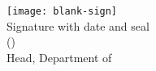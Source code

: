 \begin{titlepage}
    \vspace*{5mm}
    \begin{flushleft}
    	\texttt{[image: blank-sign]}\vspace{-3mm}\\
        Signature with date and seal\\
        (\headofdepartment)\\
        Head, Department of \department
    \end{flushleft}

\end{titlepage}